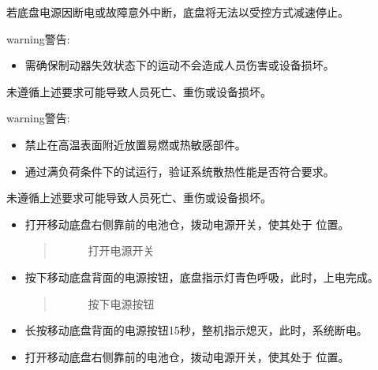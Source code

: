 \documentclass[a4paper,11pt,english,openany,oneside]{sphinxmanual}
\begin{document}
\sphinxAtStartPar
若底盘电源因断电或故障意外中断，底盘将无法以受控方式减速停止。

\begin{sphinxadmonition}{warning}{警告:}
\sphinxAtStartPar
{}
\begin{itemize}
\item {} 
\sphinxAtStartPar
需确保制动器失效状态下的运动不会造成人员伤害或设备损坏。

\end{itemize}

\sphinxAtStartPar
未遵循上述要求可能导致人员死亡、重伤或设备损坏。
\end{sphinxadmonition}

\begin{sphinxadmonition}{warning}{警告:}
\sphinxAtStartPar
{}
\begin{itemize}
\item {} 
\sphinxAtStartPar
禁止在高温表面附近放置易燃或热敏感部件。

\item {} 
\sphinxAtStartPar
通过满负荷条件下的试运行，验证系统散热性能是否符合要求。

\end{itemize}

\sphinxAtStartPar
未遵循上述要求可能导致人员死亡、重伤或设备损坏。
\end{sphinxadmonition}

\sphinxAtStartPar
{}
\begin{itemize}
\item {} 
\sphinxAtStartPar
打开移动底盘右侧靠前的电池仓，拨动电源开关，使其处于  位置。
\begin{quote}

\begin{figure}[H]
\centering
\capstart

\noindent{}
\caption{打开电源开关}\label{\detokenize{08 _u5b89_u88c5_u4e0e_u8c03_u8bd5:id64}}\end{figure}
\end{quote}

\item {} 
\sphinxAtStartPar
按下移动底盘背面的电源按钮，底盘指示灯青色呼吸，此时，上电完成。
\begin{quote}

\begin{figure}[H]
\centering
\capstart

\noindent{}
\caption{按下电源按钮}\label{\detokenize{08 _u5b89_u88c5_u4e0e_u8c03_u8bd5:id65}}\end{figure}
\end{quote}

\item {} 
\sphinxAtStartPar
长按移动底盘背面的电源按钮15秒，整机指示熄灭，此时，系统断电。

\item {} 
\sphinxAtStartPar
打开移动底盘右侧靠前的电池仓，拨动电源开关，使其处于  位置。

\end{itemize}
\end{document}
